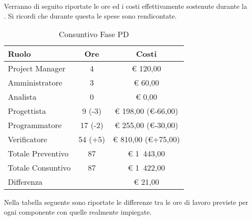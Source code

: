 			Verranno di seguito riportate le ore ed i costi effettivamente sostenute durante la . Si ricordi che durante questa  le spese sono rendicontate.
			\begin{table}[H]
				\begin{center}
					\begin{tabular}{| l | c | c |}
						\hline
						Ruolo 				& Ore 		& Costi  \\ \hline
						
						Project Manager		& 4 		& \euro{} 120,00 	\\
						Amministratore 		& 3 		& \euro{} 60,00 	\\
						Analista	 		& 0			& \euro{} 0,00	\\
						Progettista 		& 9 (-3)		& \euro{} 198,00 (\euro{}-66,00)  	\\
						Programmatore		& 17 (-2) 		& \euro{} 255,00 (\euro{}-30,00)	\\
						Verificatore		& 54 (+5)		& \euro{} 810,00 (\euro{}+75,00) 	\\ \hline \hline
						
						Totale Preventivo	& 87 		& \euro{} 1~443,00 	\\ \hline
						Totale Consuntivo	&  87 			& \euro{}  1~422,00 	\\ \hline
						Differenza			&  			& \euro{}  	21,00\\ \hline
					\end{tabular}
				\end{center}
				\caption{Consuntivo Fase PD}
			\end{table}


			Nella tabella seguente sono riportate le differenze tra le ore di lavoro previste per ogni componente con quelle realmente impiegate.

